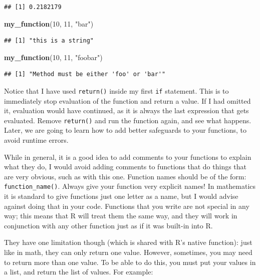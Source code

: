 \documentclass[]{gitbook}
\newenvironment{Shaded}{\begin{snugshade}}{\end{snugshade}}
\newcommand{\DecValTok}[1]{\textcolor[rgb]{0.00,0.00,0.81}{#1}}
\newcommand{\KeywordTok}[1]{\textcolor[rgb]{0.13,0.29,0.53}{\textbf{#1}}}
\newcommand{\NormalTok}[1]{#1}
\newcommand{\StringTok}[1]{\textcolor[rgb]{0.31,0.60,0.02}{#1}}
\begin{document}
\begin{verbatim}
## [1] 0.2182179
\end{verbatim}

\begin{Shaded}
\begin{Highlighting}[]
\KeywordTok{my_function}\NormalTok{(}\DecValTok{10}\NormalTok{, }\DecValTok{11}\NormalTok{, }\StringTok{"bar"}\NormalTok{)}
\end{Highlighting}
\end{Shaded}

\begin{verbatim}
## [1] "this is a string"
\end{verbatim}

\begin{Shaded}
\begin{Highlighting}[]
\KeywordTok{my_function}\NormalTok{(}\DecValTok{10}\NormalTok{, }\DecValTok{11}\NormalTok{, }\StringTok{"foobar"}\NormalTok{)}
\end{Highlighting}
\end{Shaded}

\begin{verbatim}
## [1] "Method must be either 'foo' or 'bar'"
\end{verbatim}

Notice that I have used \texttt{return()} inside my first \texttt{if} statement. This is to immediately stop
evaluation of the function and return a value. If I had omitted it, evaluation would have
continued, as it is always the last expression that gets evaluated. Remove \texttt{return()} and run the
function again, and see what happens. Later, we are going to learn how to add better safeguards to
your functions, to avoid runtime errors.

While in general, it is a good idea to add comments to your functions to explain what they do, I
would avoid adding comments to functions that do things that are very obvious, such as with this
one. Function names should be of the form: \texttt{function\_name()}. Always give your function very
explicit names! In mathematics it is standard to give functions just one letter as a name, but I
would advise against doing that in your code. Functions that you write are not special in any way;
this means that R will treat them the same way, and they will work in conjunction with any other
function just as if it was built-in into R.

They have one limitation though (which is shared with R's native function): just like in math,
they can only return one value. However, sometimes, you may need to return more than one value.
To be able to do this, you must put your values in a list, and return the list of values. For example:
\end{document}

